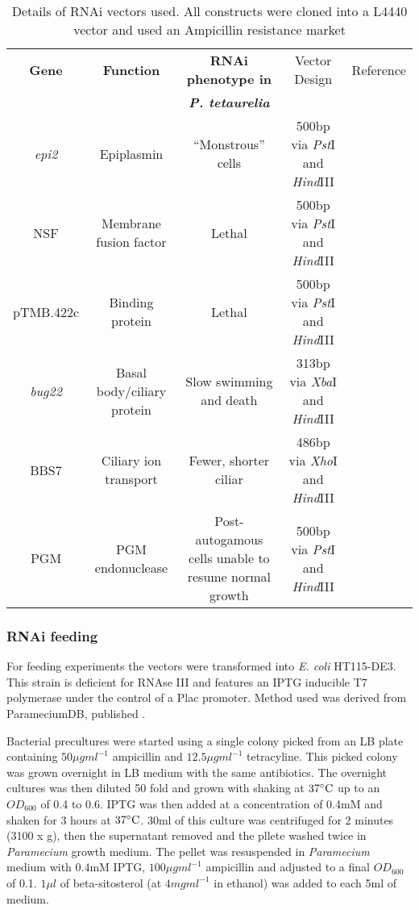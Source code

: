 \begin{table}
    \begin{tabular}{|c|c|c|c|c|}
        \hline
    \textbf{Gene} & \textbf{Function} & \textbf{RNAi phenotype in}      & Vector Design & Reference \\
                  &                   & \textbf{\textit{P. tetaurelia}} &               &           \\
        \hline
        \textit{epi2} & Epiplasmin & ``Monstrous'' cells  & 500bp via \textit{Pst}I and \textit{Hind}III & \citep{Damaj2009} \\
        NSF & Membrane fusion factor & Lethal & 500bp via \textit{Pst}I and \textit{Hind}III & \citep{Galvani2002} \\
        pTMB.422c & Binding protein & Lethal & 500bp via \textit{Pst}I and \textit{Hind}III & \citep{Nowack2011} \\
        \textit{bug22} & Basal body/ciliary protein & Slow swimming and death & 313bp via \textit{Xba}I and \textit{Hind}III & \citep{Laligne2010} \\
        BBS7 & Ciliary ion transport & Fewer, shorter ciliar & 486bp via \textit{Xho}I and \textit{Hind}III & \citep{Valentine2012} \\
        PGM & PGM endonuclease & Post-autogamous cells unable to resume normal growth & 500bp via \textit{Pst}I and \textit{Hind}III & \citep{Baudry2009} \\
        \hline
    \end{tabular}
    \caption{Details of RNAi vectors used.  All constructs were cloned into a L4440 vector and used an Ampicillin resistance market}
    \label{tab:rnai_vecs}
\end{table}

\subsubsection{RNAi feeding}

For feeding experiments the vectors were transformed into \textit{E. coli} HT115-DE3.
This strain is deficient for RNAse III and features an IPTG inducible T7 polymerase
under the control of a Plac promoter. Method used was derived from ParameciumDB, 
published \citep{Beisson2010}.

Bacterial precultures were started using a single colony picked from an LB
plate containing \(50\mu gml^{-1}\) ampicillin and \(12.5\mu g ml^{-1}\) tetracyline.
This picked colony was grown overnight in LB medium with the same antibiotics.
The overnight cultures was then diluted 50 fold and grown with shaking
at \(37\celsius\) up to an \(OD_{600}\) of 0.4 to 0.6. IPTG
was then added at a concentration of 0.4mM and shaken for 3 hours
at \(37\celsius\).  30ml of this culture was centrifuged for 2 minutes (3100 x g),
then the supernatant removed and the pllete washed twice in \textit{Paramecium}
growth medium. The pellet was resuspended in \textit{Paramecium} medium with 0.4mM IPTG,
\(100\mu g ml^{-1}\) ampicillin and adjusted to a final \(OD_{600}\) of 0.1.
\(1 \mu l\) of beta-sitosterol (at \(4mg ml^{-1}\) in ethanol) was added
to each 5ml of medium.

